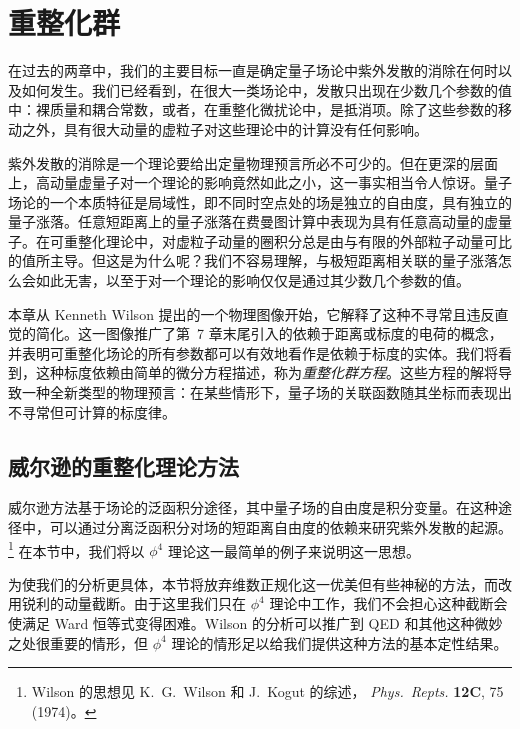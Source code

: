 \chapter{重整化群}

在过去的两章中，我们的主要目标一直是确定量子场论中紫外发散的消除在何时以及如何发生。我们已经看到，在很大一类场论中，发散只出现在少数几个参数的值中：裸质量和耦合常数，或者，在重整化微扰论中，是抵消项。除了这些参数的移动之外，具有很大动量的虚粒子对这些理论中的计算没有任何影响。

紫外发散的消除是一个理论要给出定量物理预言所必不可少的。但在更深的层面上，高动量虚量子对一个理论的影响竟然如此之小，这一事实相当令人惊讶。量子场论的一个本质特征是局域性，即不同时空点处的场是独立的自由度，具有独立的量子涨落。任意短距离上的量子涨落在费曼图计算中表现为具有任意高动量的虚量子。在可重整化理论中，对虚粒子动量的圈积分总是由与有限的外部粒子动量可比的值所主导。但这是为什么呢？我们不容易理解，与极短距离相关联的量子涨落怎么会如此无害，以至于对一个理论的影响仅仅是通过其少数几个参数的值。

本章从 Kenneth Wilson 提出的一个物理图像开始，它解释了这种不寻常且违反直觉的简化。这一图像推广了第~7 章末尾引入的依赖于距离或标度的电荷的概念，并表明可重整化场论的所有参数都可以有效地看作是依赖于标度的实体。我们将看到，这种标度依赖由简单的微分方程描述，称为\emph{重整化群方程}。这些方程的解将导致一种全新类型的物理预言：在某些情形下，量子场的关联函数随其坐标而表现出不寻常但可计算的标度律。

\section{威尔逊的重整化理论方法}

威尔逊方法基于场论的泛函积分途径，其中量子场的自由度是积分变量。在这种途径中，可以通过分离泛函积分对场的短距离自由度的依赖来研究紫外发散的起源。%
\footnote{Wilson 的思想见 K.~G.~Wilson 和 J.~Kogut 的综述，
\emph{Phys.\ Repts.} \textbf{12C}, 75 (1974)。} 在本节中，我们将以
$\phi^4$ 理论这一最简单的例子来说明这一思想。

为使我们的分析更具体，本节将放弃维数正规化这一优美但有些神秘的方法，而改用锐利的动量截断。由于这里我们只在 $\phi^4$ 理论中工作，我们不会担心这种截断会使满足 Ward 恒等式变得困难。Wilson 的分析可以推广到 QED 和其他这种微妙之处很重要的情形，但 $\phi^4$ 理论的情形足以给我们提供这种方法的基本定性结果。

